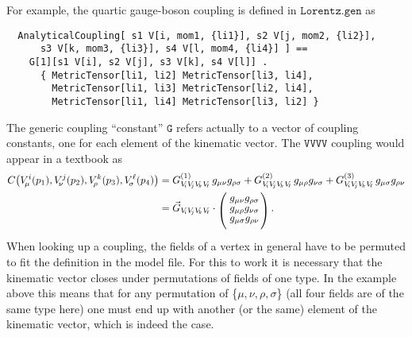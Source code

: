 \documentclass[twoside,12pt]{article}
\def\Code#1{\ensuremath{\texttt{#1}}}
\begin{document}
For example, the quartic gauge-boson coupling is defined in
\Code{Lorentz.gen} as
%
%
\begin{verbatim}
  AnalyticalCoupling[ s1 V[i, mom1, {li1}], s2 V[j, mom2, {li2}],
      s3 V[k, mom3, {li3}], s4 V[l, mom4, {li4}] ] ==
    G[1][s1 V[i], s2 V[j], s3 V[k], s4 V[l]] .
      { MetricTensor[li1, li2] MetricTensor[li3, li4],
        MetricTensor[li1, li3] MetricTensor[li2, li4],   
        MetricTensor[li1, li4] MetricTensor[li3, li2] }
\end{verbatim}
The generic coupling ``constant'' \Code{G} refers actually to a vector of
coupling constants, one for each element of the kinematic vector.  The
\Code{VVVV} coupling would appear in a textbook as
\begin{align*}
C\bigl(V_{\!\mu}^i(p_1), V_{\!\nu}^j(p_2), V_{\!\rho}^k(p_3),
V_{\!\sigma}^\ell(p_4)\bigr)
&= G_{V_{\!i}V_{\!j}V_{\!k}V_{\!\ell}}^{(1)}\,g_{\mu\nu} g_{\rho\sigma} +
   G_{V_{\!i}V_{\!j}V_{\!k}V_{\!\ell}}^{(2)}\,g_{\mu\rho} g_{\nu\sigma} +
   G_{V_{\!i}V_{\!j}V_{\!k}V_{\!\ell}}^{(3)}\,g_{\mu\sigma} g_{\rho\nu} \\
&= \vec G_{V_{\!i}V_{\!j}V_{\!k}V_{\!\ell}}\cdot
\lower .5ex\hbox{$\left(\vrule width 0pt height 4ex depth 4ex\right.$}
\!\!
\begin{array}{l}
g_{\mu\nu} g_{\rho\sigma} \\[-.5ex]
g_{\mu\rho} g_{\nu\sigma} \\[-.5ex]
g_{\mu\sigma} g_{\rho\nu}
\end{array}
\!\!\!
\lower .5ex\hbox{$\left.\vrule width 0pt height 4ex depth 4ex\right)$}
\,.
\end{align*}
When looking up a coupling, the fields of a vertex in general have to be
permuted to fit the definition in the model file.  For this to work it is
necessary that the kinematic vector closes under permutations of fields of
one type.  In the example above this means that for any permutation of
\{$\mu,\nu,\rho,\sigma$\} (all four fields are of the same type here) one
must end up with another (or the same) element of the kinematic vector,
which is indeed the case.%
%
\end{document}
